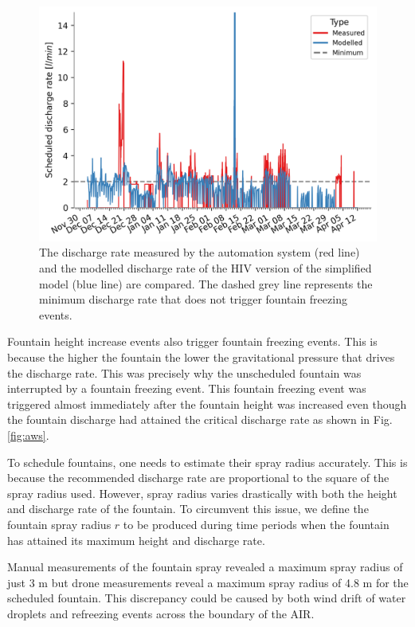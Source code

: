\documentclass[tc, manuscript]{copernicus}
\begin{document}
\begin{figure}[t]
\includegraphics[width=12cm]{Figures/simvsreal.png}

\caption{ The discharge rate measured by the automation system (red line) and the modelled discharge rate of the HIV version
  of the simplified model (blue line) are compared. The dashed grey line represents the minimum discharge rate
that does not trigger fountain freezing events. }

\label{fig:simvsreal}
\end{figure}

Fountain height increase events also trigger fountain freezing events. This is because the higher the fountain
the lower the gravitational pressure that drives the discharge rate. This was precisely why the unscheduled
fountain was interrupted by a fountain freezing event. This fountain freezing event was triggered almost
immediately after the fountain height was increased even though the fountain discharge had attained the critical
discharge rate as shown in Fig. \ref{fig:aws}. 

To schedule fountains, one needs to estimate their spray radius accurately. This is because the recommended
discharge rate are proportional to the square of the spray radius used. However, spray radius varies drastically
with both the height and discharge rate of the fountain. To circumvent this issue, we define the fountain spray
radius $r$ to be produced during time periods when the fountain has attained its maximum height and discharge
rate. 

Manual measurements of the fountain spray revealed a maximum spray radius of just 3 m but drone measurements
reveal a maximum spray radius of 4.8 m for the scheduled fountain. This discrepancy could be caused by both wind
drift of water droplets and refreezing events across the boundary of the AIR. 
\end{document}
